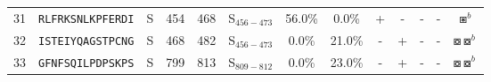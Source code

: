 \begin{tabular}{rcccccccccccc}
31 &  \texttt{RLFRKSNLKPFERDI} &       S &    454 &   468 &  S$_{456-473}$ &                          56.0\% &                            0.0\% &          + &           - &          - &           - &                                                                                                           $ \boxast^b $ \\
32 &  \texttt{ISTEIYQAGSTPCNG} &       S &    468 &   482 &  S$_{456-473}$ &                           0.0\% &                           21.0\% &          - &           + &          - &           - &                                                                                             $ \boxcircle \boxcircle^b $ \\
33 &  \texttt{GFNFSQILPDPSKPS} &       S &    799 &   813 &  S$_{809-812}$ &                           0.0\% &                           23.0\% &          - &           + &          - &           - &                                                                                             $ \boxcircle \boxcircle^b $ \\
\bottomrule
\end{tabular}
